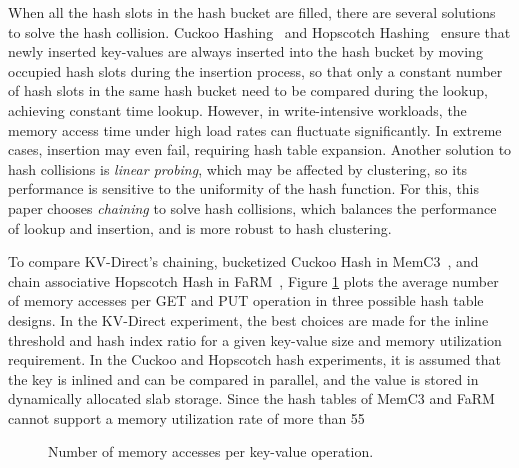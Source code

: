 When all the hash slots in the hash bucket are filled, there are several solutions to solve the hash collision. Cuckoo Hashing~\cite{pagh2004cuckoo} and Hopscotch Hashing~\cite{herlihy2008hopscotch} ensure that newly inserted key-values are always inserted into the hash bucket by moving occupied hash slots during the insertion process, so that only a constant number of hash slots in the same hash bucket need to be compared during the lookup, achieving constant time lookup. However, in write-intensive workloads, the memory access time under high load rates can fluctuate significantly. In extreme cases, insertion may even fail, requiring hash table expansion. Another solution to hash collisions is \textit{linear probing}, which may be affected by clustering, so its performance is sensitive to the uniformity of the hash function. For this, this paper chooses \textit{chaining} to solve hash collisions, which balances the performance of lookup and insertion, and is more robust to hash clustering.

To compare KV-Direct's chaining, bucketized Cuckoo Hash in MemC3~\cite{fan2013memc3}, and chain associative Hopscotch Hash in FaRM~\cite{dragojevic2014farm}, Figure \ref{kvdirect:fig:mem-access-tput} plots the average number of memory accesses per GET and PUT operation in three possible hash table designs. In the KV-Direct experiment, the best choices are made for the inline threshold and hash index ratio for a given key-value size and memory utilization requirement. In the Cuckoo and Hopscotch hash experiments, it is assumed that the key is inlined and can be compared in parallel, and the value is stored in dynamically allocated slab storage. Since the hash tables of MemC3 and FaRM cannot support a memory utilization rate of more than 55%

\begin{figure}[htbp]
	\centering
	
	\vfill
	
	\caption{Number of memory accesses per key-value operation.}
	\label{kvdirect:fig:mem-access-tput}
\end{figure}

